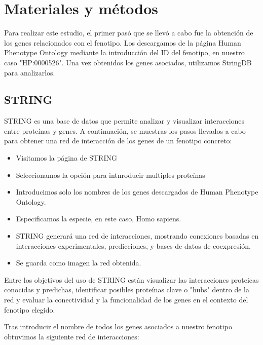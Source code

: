 \section{Materiales y métodos}

Para realizar este estudio, el primer pasó que se llevó a cabo fue la obtención de los genes relacionados con el fenotipo. Los descargamos de la página Human Phenotype Ontology mediante la introducción del ID del fenotipo, en nuestro caso "HP:0000526". Una vez obtenidos los genes asociados, utilizamos StringDB para analizarlos.


\subsection{STRING}


STRING es una base de datos que permite analizar y visualizar interacciones entre proteínas y genes. A continuación, se muestras los pasos llevados a cabo para obtener una red de interacción de los genes de un fenotipo concreto:

\begin{itemize}
	\item Visitamos la página de STRING
	\item Seleccionamos la opción para intnroducir multiples proteínas
	\item Introducimos solo los nombres de los genes descargados de Human Phenotype Ontology.
	\item Especificamos la especie, en este caso, Homo sapiens.
	\item STRING generará una red de interacciones, mostrando conexiones basadas en interacciones experimentales, predicciones, y bases de datos de coexpresión.
	\item Se guarda como imagen la red obtenida.
\end{itemize}

Entre los objetivos del uso de STRING están visualizar las interacciones proteicas conocidas y predichas, identificar posibles proteínas clave o "hubs" dentro de la red y evaluar la conectividad y la funcionalidad de los genes en el contexto del fenotipo elegido.
	
Tras introducir el nombre de todos los genes asociados a nuestro fenotipo obtuvimos la siguiente red de interacciones:

\newpage

